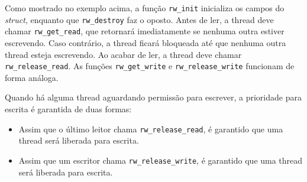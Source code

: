 \documentclass[12pt]{article}
\begin{document}
Como mostrado no exemplo acima,
a função \texttt{rw\_init}
inicializa os campos do \textit{struct},
enquanto que \texttt{rw\_destroy} faz o oposto.
Antes de ler,
a thread deve chamar \texttt{rw\_get\_read},
que retornará imediatamente
se nenhuma outra estiver escrevendo.
Caso contrário, a thread ficará bloqueada
até que nenhuma outra thread esteja escrevendo.
Ao acabar de ler,
a thread deve chamar \texttt{rw\_release\_read}.
As funções \texttt{rw\_get\_write} e \texttt{rw\_release\_write}
funcionam de forma análoga.

Quando há alguma thread aguardando permissão para escrever,
a prioridade para escrita é garantida de duas formas:
\begin{itemize}
	\item Assim que o último leitor chama \texttt{rw\_release\_read},
		é garantido que uma thread será liberada para escrita.
	\item Assim que um escritor chama \texttt{rw\_release\_write},
		é garantido que uma thread será liberada para escrita.
\end{itemize}
\end{document}
